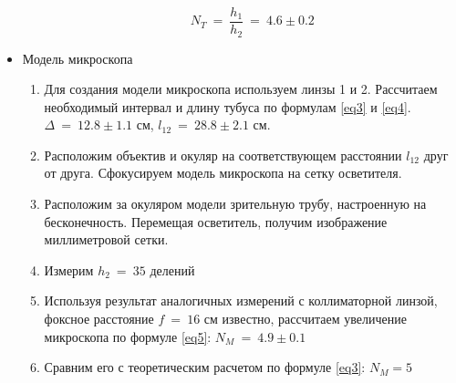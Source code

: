 \documentclass[a4paper, 12pt]{article}
\begin{document}
\begin{itemize}
\begin{enumerate}
                \begin{equation*}
                    N_T~=~\dfrac{h_1}{h_2}~=~4.6 \pm 0.2
                \end{equation*}
            \end{enumerate}

        \item Модель микроскопа
            \begin{enumerate}
                \item Для создания модели микроскопа используем линзы 1 и 2. Рассчитаем необходимый интервал и длину тубуса по формулам \ref{eq3} и \ref{eq4}. $\Delta~=~12.8 \pm 1.1$ см, $l_{12}~=~28.8 \pm 2.1$ см.
                \item Расположим объектив и окуляр на соответствующем расстоянии $l_{12}$ друг от друга. Сфокусируем модель микроскопа на сетку осветителя.
                \item Расположим за окуляром модели зрительную трубу, настроенную на бесконечность. Перемещая осветитель, получим изображение миллиметровой сетки.
                \item Измерим $h_2~=~35$ делений
                \item Используя результат аналогичных измерений с коллиматорной линзой, фоксное расстояние $f~=~16$ см известно, рассчитаем увеличение микроскопа по формуле \ref{eq5}: $N_M~=~4.9 \pm 0.1$
                \item Сравним его с теоретическим расчетом по формуле \ref{eq3}: $N_M = 5$
            \end{enumerate}
    \end{itemize}
\end{document}
